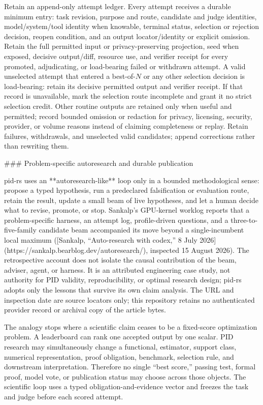 \documentclass[11pt]{article}
\begin{document}
\begin{markdown}
Retain an append-only attempt ledger. Every attempt receives a durable minimum entry: task revision,
purpose and route, candidate and judge identities, model/system/tool identity when knowable,
terminal status, selection or rejection decision, reopen condition, and an output locator/identity
or explicit omission. Retain the full permitted input or privacy-preserving projection, seed when
exposed, decisive output/diff, resource use, and verifier receipt for every promoted, adjudicating,
or load-bearing failed or withdrawn attempt. A valid unselected attempt that entered a best-of-$N$
or any other selection decision is load-bearing: retain its decisive permitted output and verifier
receipt. If that record is unavailable, mark the selection route incomplete and grant it no strict
selection credit. Other routine outputs are retained only when useful and permitted; record bounded
omission or redaction for privacy, licensing, security, provider, or volume reasons instead of
claiming completeness or replay. Retain failures, withdrawals, and unselected valid candidates;
append corrections rather than rewriting them.

### Problem-specific autoresearch and durable publication

pid-rs uses an **autoresearch-like** loop only in a bounded methodological sense: propose a typed
hypothesis, run a predeclared falsification or evaluation route, retain the result, update a small
beam of live hypotheses, and let a human decide what to revise, promote, or stop. Sankalp's
GPU-kernel worklog reports that a problem-specific harness, an attempt log, profile-driven
questions, and a three-to-five-family candidate beam accompanied its move beyond a
single-incumbent local maximum
([Sankalp, “Auto-research with codex,” 8 July 2026](https://sankalp.bearblog.dev/autoresearch/),
inspected 15 August 2026). The retrospective account does not isolate the causal contribution of
the beam, adviser, agent, or harness. It is an attributed engineering case study, not authority for
PID validity, reproducibility, or optimal research design; pid-rs adopts only the lessons that
survive its own claim analysis. The URL and inspection date are source locators only; this
repository retains no authenticated provider record or archival copy of the article bytes.

The analogy stops where a scientific claim ceases to be a fixed-score optimization problem. A
leaderboard can rank one accepted output by one scalar. PID research may simultaneously change a
functional, estimator, support class, numerical representation, proof obligation, benchmark,
selection rule, and downstream interpretation. Therefore no single “best score,” passing test,
formal proof, model vote, or publication status may choose across those objects. The scientific
loop uses a typed obligation-and-evidence vector and freezes the task and judge before each scored
attempt.


\end{markdown}
\end{document}

